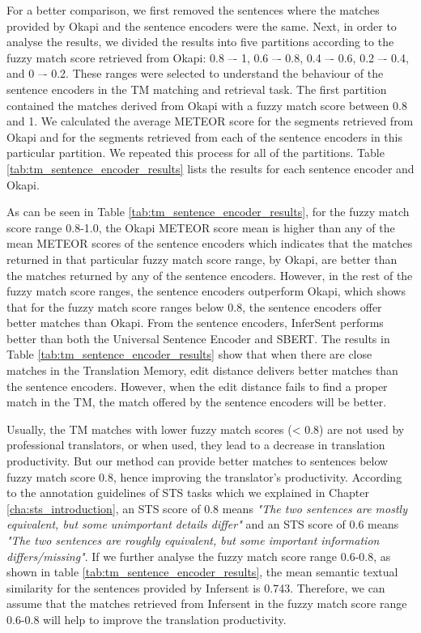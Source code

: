 For a better comparison, we first removed the sentences where the matches provided by Okapi and the sentence encoders were the same. Next, in order to analyse the results, we divided the results into five partitions according to the fuzzy match score retrieved from Okapi: 0.8 –- 1, 0.6 –- 0.8, 0.4 –- 0.6, 0.2 –- 0.4, and 0 –- 0.2. These ranges were selected to understand the behaviour of the sentence encoders in the TM matching and retrieval task. The first partition contained the matches derived from Okapi with a fuzzy match score between 0.8 and 1. We calculated the average METEOR score for the segments retrieved from Okapi and for the segments retrieved from each of the sentence encoders in this particular partition. We repeated this process for all of the partitions. Table \ref{tab:tm_sentence_encoder_results} lists the results for each sentence encoder and Okapi. 

As can be seen in Table \ref{tab:tm_sentence_encoder_results}, for the fuzzy match score range 0.8-1.0, the Okapi METEOR score mean is higher than any of the mean METEOR scores of the sentence encoders which indicates that the matches returned in that particular fuzzy match score range, by Okapi, are better than the matches returned by any of the sentence encoders. However, in the rest of the fuzzy match score ranges, the sentence encoders outperform Okapi, which shows that for the fuzzy match score ranges below 0.8, the sentence encoders offer better matches than Okapi. From the sentence encoders, InferSent performs better than both the Universal Sentence Encoder and SBERT. The results in Table \ref{tab:tm_sentence_encoder_results} show that when there are close matches in the Translation Memory, edit distance delivers better matches than the sentence encoders. However, when the edit distance fails to find a proper match in the TM, the match offered by the sentence encoders will be better. 

Usually, the TM matches with lower fuzzy match scores (< 0.8) are not used by professional translators, or when used, they lead to a decrease in translation productivity. But our method can provide better matches to sentences below fuzzy match score 0.8, hence improving the translator's productivity. According to the annotation guidelines of STS tasks which we explained in Chapter \ref{cha:sts_introduction}, an STS score of 0.8 means \textit{"The two sentences are mostly equivalent, but some unimportant details differ"} and an STS score of 0.6 means \textit{"The two sentences are roughly equivalent, but some important information differs/missing"}. If we further analyse the fuzzy match score range 0.6-0.8, as shown in table \ref{tab:tm_sentence_encoder_results}, the mean semantic textual similarity for the sentences provided by Infersent is 0.743. Therefore, we can assume that the matches retrieved from Infersent in the fuzzy match score range 0.6-0.8 will help to improve the translation productivity.


